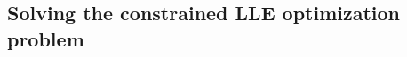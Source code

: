 \documentclass[10pt]{article}
\begin{document}
\subsection{Solving the constrained LLE optimization problem}
\vspace*{1mm}
\end{document}
